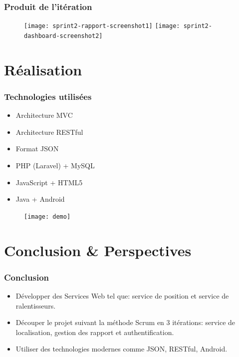 \documentclass{beamer}
\begin{document}
\begin{frame}
    \frametitle{Produit de l'itération}
    \begin{figure}
        \texttt{[image: sprint2-rapport-screenshot1]}
        \texttt{[image: sprint2-dashboard-screenshot2]}
    \end{figure}
\end{frame}


\section{Réalisation}

\begin{frame}
    \frametitle{Technologies utilisées}
    \begin{itemize}
        \item Architecture MVC
        \item Architecture RESTful
        \item Format JSON
        \item PHP (Laravel) + MySQL
        \item JavaScript + HTML5
        \item Java + Android
    \end{itemize}
\end{frame}

\begin{frame}
    \begin{center}
    \begin{figure}
        \texttt{[image: demo]}
    \end{figure}
    \end{center}
\end{frame}

\section{Conclusion \& Perspectives}

\begin{frame}
    \frametitle{Conclusion}
    \begin{itemize}
        \item Développer des Services Web tel que: service de position et service de ralentisseurs.
        \item Découper le projet suivant la méthode Scrum en 3 itérations: service de localisation, gestion des rapport et authentification.
        \item Utiliser des technologies modernes comme JSON, RESTful, Android.
    \end{itemize}
\end{frame}
\end{document}
